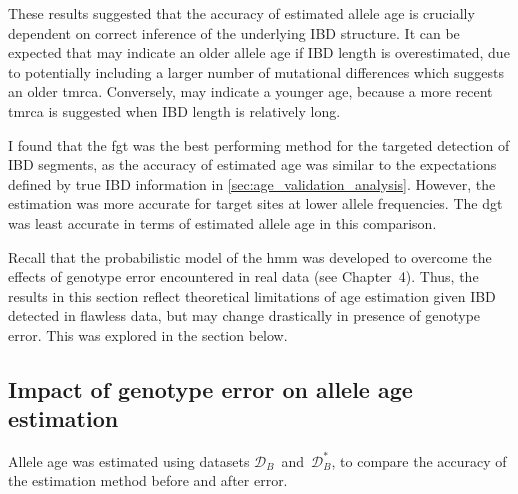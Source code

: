 These results suggested that the accuracy of estimated allele age is crucially dependent on correct inference of the underlying IBD structure.
It can be expected that \ClockM may indicate an older allele age if IBD length is overestimated, due to potentially including a larger number of mutational differences which suggests an older \gls{tmrca}.
Conversely, \ClockR may indicate a younger age, because a more recent \gls{tmrca} is suggested when IBD length is relatively long.


I found that the \gls{fgt} was the best performing method for the targeted detection of IBD segments, as the accuracy of estimated age was similar to the expectations defined by true IBD information in \cref{sec:age_validation_analysis}.
However, the estimation was more accurate for target sites at lower allele frequencies.
The \gls{dgt} was least accurate in terms of estimated allele age in this comparison.

Recall that the probabilistic model of the \gls{hmm} was developed to overcome the effects of genotype error encountered in real data (see Chapter~4).
Thus, the results in this section reflect theoretical limitations of age estimation given IBD detected in flawless data, but may change drastically in presence of genotype error.
This was explored in the section below.



%
\subsection{Impact of genotype error on allele age estimation}
\label{sec:age_generror}
%

Allele age was estimated using datasets $\mathcal{D}_B$~and~$\mathcal{D}_B^{\ast}$, to compare the accuracy of the estimation method before and after error.

